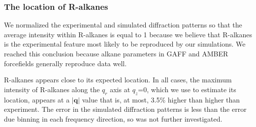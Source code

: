 \documentclass[journal=jpcbfk,manuscript=article]{achemso}
\begin{document}
%
  
  \subsubsection{The location of R-alkanes}\label{section:ralkanes}

  We normalized the experimental and simulated diffraction patterns so that the
  average intensity within R-alkanes is equal to 1 because we believe that
  R-alkanes is the experimental feature most likely to be reproduced by our
  simulations.  We reached this conclusion because alkane parameters in GAFF and
  AMBER forcefields generally reproduce data well.~\cite{wang_development_2004,caleman_force_2012} 

  R-alkanes appears close to its expected location. In all cases, the maximum
  intensity of R-alkanes along the $q_r$ axis at $q_z$=0, which we use to
  estimate its location, appears at a $|\mathbf{q}|$ value that is, at most,
  3.5\% higher than higher than experiment. The error in the simulated 
  diffraction patterns is less than the error due binning in each frequency
  direction, so was not further investigated. 
\end{document}
